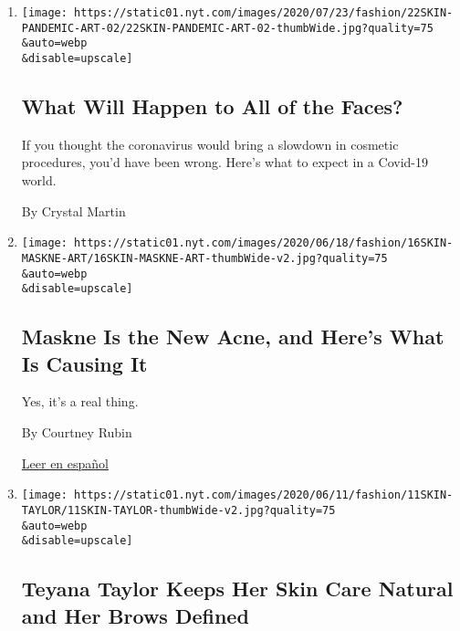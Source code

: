 \begin{enumerate}
\def\labelenumi{\arabic{enumi}.}
\item
  \href{/2020/07/23/style/skin-care-plastic-surgery-what-will-happen-to-all-of-the-faces.html}{}

  \texttt{[image: https://static01.nyt.com/images/2020/07/23/fashion/22SKIN-PANDEMIC-ART-02/22SKIN-PANDEMIC-ART-02-thumbWide.jpg?quality=75\\\&auto=webp\\\&disable=upscale]}

  \hypertarget{what-will-happen-to-all-of-the-faces}{%
  \subsection{What Will Happen to All of the
  Faces?}\label{what-will-happen-to-all-of-the-faces}}

  If you thought the coronavirus would bring a slowdown in cosmetic
  procedures, you'd have been wrong. Here's what to expect in a Covid-19
  world.

  By Crystal Martin
\item
  \href{/article/maskne-acne.html}{}

  \texttt{[image: https://static01.nyt.com/images/2020/06/18/fashion/16SKIN-MASKNE-ART/16SKIN-MASKNE-ART-thumbWide-v2.jpg?quality=75\\\&auto=webp\\\&disable=upscale]}

  \hypertarget{maskne-is-the-new-acne-and-heres-what-is-causing-it}{%
  \subsection{Maskne Is the New Acne, and Here's What Is Causing
  It}\label{maskne-is-the-new-acne-and-heres-what-is-causing-it}}

  Yes, it's a real thing.

  By Courtney Rubin

  \href{https://www.nytimes.com/es/2020/06/20/espanol/estilos-de-vida/mascarilla-acne-maskne.html}{Leer
  en español}
\item
  \href{/2020/06/10/style/teyana-taylor-keeps-her-skin-care-natural-and-her-brows-defined.html}{}

  \texttt{[image: https://static01.nyt.com/images/2020/06/11/fashion/11SKIN-TAYLOR/11SKIN-TAYLOR-thumbWide-v2.jpg?quality=75\\\&auto=webp\\\&disable=upscale]}

  \hypertarget{teyana-taylor-keeps-her-skin-care-natural-and-her-brows-defined}{%
  \subsection{Teyana Taylor Keeps Her Skin Care Natural and Her Brows
  Defined}\label{teyana-taylor-keeps-her-skin-care-natural-and-her-brows-defined}}


\end{enumerate}
